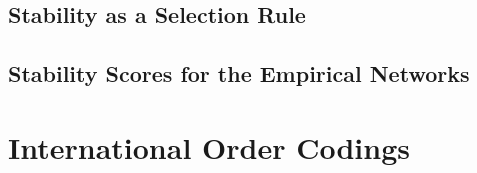 \documentclass[11pt, letterpaper]{article}
\numberwithin{equation}{section}
\begin{document}
\subsection{Stability as a Selection Rule}
\begin{table}[ht]
\centering\scriptsize
\caption{Stability as a selection rule on the 72-configuration regime grid (720 series): share of series in which the method with the higher stability score is also the more accurate, share in which the rule picks DynMux, and mean joint NMI of the rule against always choosing DynMux, always choosing multislice, and an oracle.}
\label{tab:app_selection_rule}

\end{table}

\subsection{Stability Scores for the Empirical Networks}
\begin{table}[ht]
\centering\small
\caption{Bootstrap stability score $s$, calibrated accuracy floor, share of decided node pairs, share of nodes with $s_i \geq 0.9$, and mean community count for DynMux (Jaccard, $B = 100$) and multislice (adjacent links, $B = 15$) on each empirical network.}
\label{tab:app_empirical_stability}

\end{table}

\section{International Order Codings}
\label{app:orders}

\begin{table}[ht]\centering
\caption{Coded international orders, their type, active years, and the
networks in which each is observed.}
\label{tab:app_orders}
\end{table}
\end{document}
